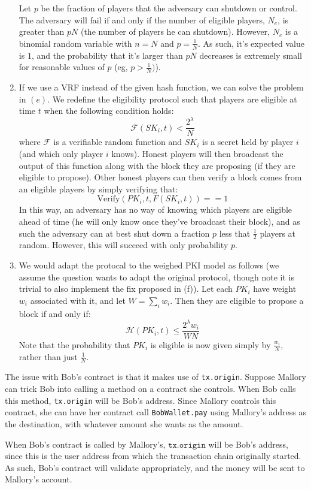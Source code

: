 \documentclass[12pt]{exam}
\newcommand{\Q}[1]{\question{\large{\textbf{#1}}}}
\begin{document}
\begin{questions}
\begin{solution}
\begin{enumerate}[label=\textbf{\alph*.}]
      Let $p$ be the fraction of players that the adversary can shutdown or control. The adversary will fail if and only if the number of eligible players, $N_{e}$, is greater than $pN$ (the number of players he can shutdown). However, $N_{e}$ is a binomial random variable with $n = N$ and $p = \frac{1}{N}$. As such, it's expected value is $1$, and the probability that it's larger than $pN$ decreases is extremely small for reasonable values of $p$ (eg, $p > \frac{1}{N})$).
    \item
      If we use a VRF instead of the given hash function, we can solve the problem in $(e)$. We redefine the eligibility protocol such that players are eligible at time $t$ when the following condition holds:
      \[
        \mathcal{F}(SK_i, t) < \frac{2^{\lambda}}{N}
      \] 
      where $\mathcal{F}$ is a verifiable random function and $SK_i$ is a secret held by player $i$ (and which only player $i$ knows). Honest players will then broadcast the output of this function along with the block they are proposing (if they are eligible to propose). Other honest players can then verify a block comes from an eligible players by simply verifying that:
      \[
        \text{Verify}(PK_i, t, F(SK_i, t)) == 1
      \]
      In this way, an adversary has no way of knowing which players are eligible ahead of time (he will only know once they've broadcast their block), and as such the adversary can at best shut down a fraction $p$ less that $\frac{1}{2}$ players at random. However, this will succeed with only probability $p$.
    \item 
      We would adapt the protocal to the weighed PKI model as follows (we assume the question wants to adapt the original protocol, though note it is trivial to also implement the fix proposed in (f)). Let each $PK_i$ have weight $w_i$ associated with it, and let $W = \sum_i w_i$. Then they are eligible to propose a block if and only if:
      \[
        \mathcal{H}(PK_i, t) \leq \frac{2^{\lambda}w_i}{WN}
      \]
      Note that the probability that $PK_i$ is eligible is now given simply by $\frac{w_i}{N}$, rather than just $\frac{1}{N}$.
  \end{enumerate}
\end{solution}

\newpage
\Q{Problem 6}
\begin{solution}
  The issue with Bob's contract is that it makes use of \texttt{tx.origin}. Suppose Mallory can trick Bob into calling a method on a contract she controls. When Bob calls this method, \texttt{tx.origin} will be Bob's address. Since Mallory controls this contract, she can have her contract call \texttt{BobWallet.pay} using Mallory's address as the destination, with whatever amount she wants as the amount.

  When Bob's contract is called by Mallory's, $\texttt{tx.origin}$ will be Bob's address, since this is the user address from which the transaction chain originally started. As such, Bob's contract will validate appropriately, and the money will be sent to Mallory's account.
\end{solution}
\end{questions}
\end{document}
